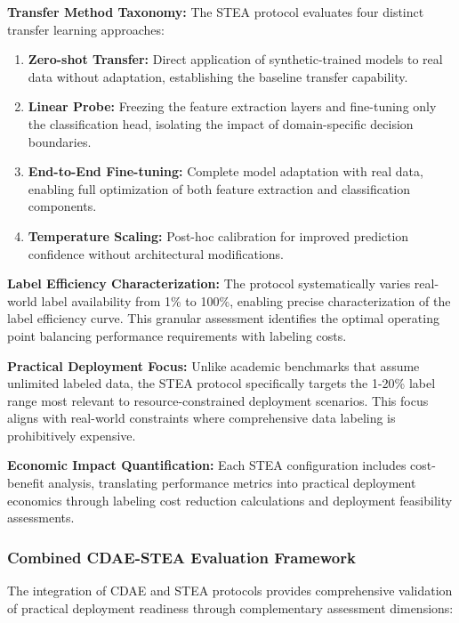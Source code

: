 \textbf{Transfer Method Taxonomy:} The STEA protocol evaluates four distinct transfer learning approaches:

\begin{enumerate}
\item \textbf{Zero-shot Transfer:} Direct application of synthetic-trained models to real data without adaptation, establishing the baseline transfer capability.

\item \textbf{Linear Probe:} Freezing the feature extraction layers and fine-tuning only the classification head, isolating the impact of domain-specific decision boundaries.

\item \textbf{End-to-End Fine-tuning:} Complete model adaptation with real data, enabling full optimization of both feature extraction and classification components.

\item \textbf{Temperature Scaling:} Post-hoc calibration for improved prediction confidence without architectural modifications.
\end{enumerate}

\textbf{Label Efficiency Characterization:} The protocol systematically varies real-world label availability from 1\% to 100\%, enabling precise characterization of the label efficiency curve. This granular assessment identifies the optimal operating point balancing performance requirements with labeling costs.

\textbf{Practical Deployment Focus:} Unlike academic benchmarks that assume unlimited labeled data, the STEA protocol specifically targets the 1-20\% label range most relevant to resource-constrained deployment scenarios. This focus aligns with real-world constraints where comprehensive data labeling is prohibitively expensive.

\textbf{Economic Impact Quantification:} Each STEA configuration includes cost-benefit analysis, translating performance metrics into practical deployment economics through labeling cost reduction calculations and deployment feasibility assessments.

\subsubsection{Combined CDAE-STEA Evaluation Framework}

The integration of CDAE and STEA protocols provides comprehensive validation of practical deployment readiness through complementary assessment dimensions:

